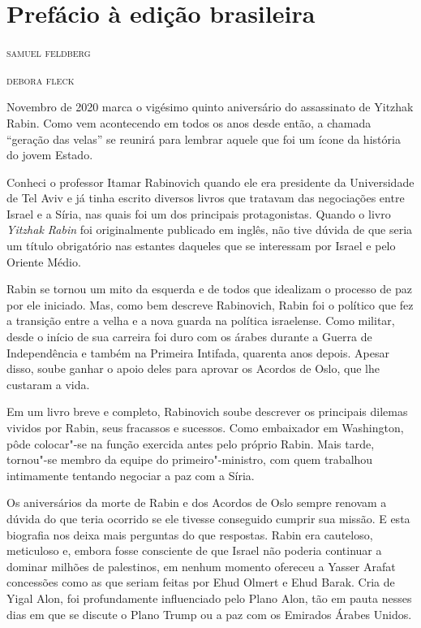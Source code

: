 \chapter{Prefácio à edição brasileira}

\begin{flushright}
\textsc{samuel feldberg}

\textsc{debora fleck}
\end{flushright}


\noindent{}Novembro de 2020 marca o vigésimo quinto aniversário do assassinato de
Yitzhak Rabin. Como vem acontecendo em todos os anos desde então, a
chamada ``geração das velas'' se reunirá para lembrar aquele que foi um
ícone da história do jovem Estado.

Conheci o professor Itamar Rabinovich quando ele era presidente da
Universidade de Tel Aviv e já tinha escrito diversos livros que tratavam
das negociações entre Israel e a Síria, nas quais foi um dos principais
protagonistas. Quando o livro \textit{Yitzhak Rabin} foi originalmente publicado 
em inglês, não tive dúvida de que
seria um título obrigatório nas estantes daqueles que se interessam por
Israel e pelo Oriente Médio.

Rabin se tornou um mito da esquerda e de todos que idealizam o processo
de paz por ele iniciado. Mas, como bem descreve Rabinovich, Rabin foi o
político que fez a transição entre a velha e a nova guarda na política
israelense. Como militar, desde o início de sua carreira foi duro com os
árabes durante a Guerra de Independência e também na Primeira Intifada,
quarenta anos depois. Apesar disso, soube ganhar o apoio deles para
aprovar os Acordos de Oslo, que lhe custaram a vida.

Em um livro breve e completo, Rabinovich soube descrever os principais
dilemas vividos por Rabin, seus fracassos e sucessos. Como embaixador em
Washington, pôde colocar"-se na função exercida antes pelo próprio Rabin.
Mais tarde, tornou"-se membro da equipe do
primeiro"-ministro, com quem trabalhou intimamente tentando negociar a paz
com a Síria.

Os aniversários da morte de Rabin e dos Acordos de Oslo sempre renovam a
dúvida do que teria ocorrido se ele tivesse conseguido cumprir sua
missão. E esta biografia nos deixa mais perguntas do que respostas.
Rabin era cauteloso, meticuloso e, embora fosse consciente de que Israel não poderia continuar a dominar milhões de palestinos, em nenhum momento ofereceu a Yasser Arafat concessões como as que seriam feitas por Ehud Olmert e Ehud Barak. Cria de Yigal Alon, foi profundamente influenciado pelo Plano Alon, tão em pauta nesses dias em que se discute o Plano Trump ou a paz com os Emirados Árabes Unidos.

